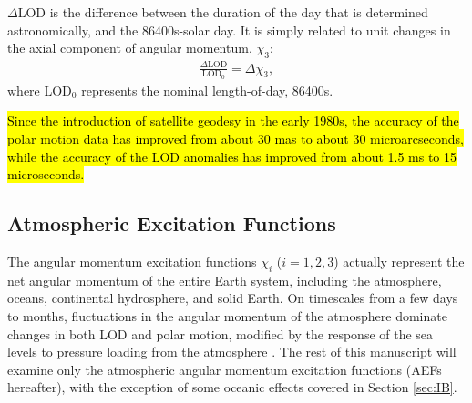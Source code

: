 \documentclass[draft,jgrga]{agutex}
\begin{document}
\begin{article}
$\Delta$LOD is the difference between the duration of the day that is determined astronomically, and the 86400s-solar day.
It is simply related to unit changes in the axial component of angular momentum, $\chi_3$:
\begin{eqnarray}
\frac{\Delta \text{LOD}}{ \text{LOD}_0 } = \Delta \chi_3,
\label{eq:LOD_to_AEF}
\end{eqnarray}
where LOD$_0$  {represents the nominal length-of-day, 86400s}.

\hl{Since the introduction of satellite geodesy in the early 1980s, the accuracy of the polar motion data has improved from about 30 mas to about 30 microarcseconds, while the accuracy of the LOD anomalies has improved from about 1.5 ms to 15 microseconds.} 
\subsection{Atmospheric Excitation Functions}

 {The angular momentum excitation functions}  $\chi_i$ ($i=1,2,3$)  {actually represent the net angular momentum of the entire Earth system, including the atmosphere, oceans, continental hydrosphere, and solid Earth.
On timescales from a few days to months, fluctuations in the angular momentum of the atmosphere dominate changes in both LOD} \citep{Rosen1983, Rosen1990}  {and polar motion, modified by the response of the sea levels to pressure loading from the atmosphere} \citep{Eubanks1988}.
 {The rest of this manuscript will examine only the atmospheric angular momentum excitation functions (AEFs hereafter), with the exception of some oceanic effects covered in Section} \ref{sec:IB}.


\end{article}
\end{document}
